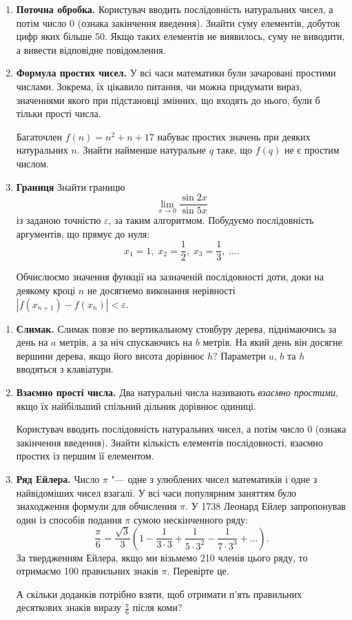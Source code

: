 \begin{enumerate}
\item \textbf{Поточна обробка.} Користувач вводить послідовність натуральних чисел, а потім число 0 (ознака закінчення введення). Знайти суму елементів, добуток цифр яких більше 50. Якщо таких елементів не виявилось, суму не виводити, а вивести відповідне повідомлення.

\item \textbf{Формула простих чисел.} У всі часи математики були зачаровані простими числами. Зокрема, їх цікавило питання, чи можна придумати вираз, значеннями якого при підстановці змінних, що входять до нього, були б тільки прості числа.

Багаточлен $f(n)=n^2+n+17$ набуває простих значень при деяких натуральних $n$. Знайти найменше натуральне $q$ таке, що $f(q)$ не є простим числом.
\item \textbf{Границя} Знайти границю
$$
\lim_{x\to 0}\frac{\sin 2x}{\sin 5x}
$$
із заданою точністю $\varepsilon$, за таким алгоритмом. Побудуємо послідовність аргументів, що прямує до нуля:
$$
x_1 = 1,\; x_2=\frac{1}{2}, \; x_3=\frac{1}{3}, \;\ldots.
$$

Обчислюємо значення функції на зазначеній послідовності доти, доки на деякому кроці $n$ не досягнемо виконання нерівності
$\left|f(x_{n+1})-f(x_n)\right|<\varepsilon$.
\end{enumerate}





\begin{enumerate}
\item \textbf{Слимак.} Слимак повзе по вертикальному стовбуру дерева, піднімаючись за день на $a$ метрів, а за ніч спускаючись на $b$ метрів. На який день він досягне вершини дерева, якщо його висота дорівнює $h$? Параметри $a$, $b$ та $h$ вводяться з клавіатури.

\item \textbf{Взаємно прості числа.} Два натуральні числа називають {\itshape взаємно простими}, якщо їх найбільший спільний дільник дорівнює одиниці.

Користувач вводить послідовність натуральних чисел, а потім число 0 (ознака закінчення введення). Знайти кількість елементів послідовності, взаємно простих із першим її елементом.
\item \textbf{Ряд Ейлера.} Число $\pi$ "--- одне з улюблених чисел математиків і одне з найвідоміших чисел взагалі. У всі часи популярним заняттям було знаходження формули для обчислення $\pi$. У 1738 Леонард Ейлер запропонував один із способів подання $\pi$ сумою нескінченного ряду:
$$
\frac{\pi}{6}=\frac{\sqrt{3}}{3}\left(1-\frac{1}{3\cdot 3}+\frac{1}{5\cdot 3^2}-\frac{1}{7\cdot 3^3}+\ldots\right).
$$
За твердженням Ейлера, якщо ми візьмемо 210 членів цього ряду, то отримаємо 100 правильних знаків $\pi$. Перевірте це.

А скільки доданків потрібно взяти, щоб отримати п'ять правильних десяткових знаків виразу $\frac{\pi}{6}$ після коми?
\end{enumerate}



